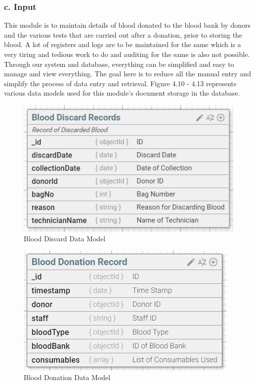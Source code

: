 \documentclass[BTech]{srmuthesis}
\begin{document}
\subsubsection{c. Input}
This module is to maintain details of blood donated to the blood bank by donors and the various tests that are carried out after a donation, prior to storing the blood. A lot of registers and logs are to be maintained for the same which is a very tiring and tedious work to do and auditing for the same is also not possible. Through our system and database, everything can be simplified and easy to manage and view everything. The goal here is to reduce all the manual entry and simplify the process of data entry and retrieval. Figure 4.10 - 4.13 represents various data models used for this module's document storage in the database.
\begin{figure}[H]
	\centering
	\includegraphics[scale=0.6]{input_blood_discard_rec.jpeg}
	\caption{Blood Discard Data Model}
\end{figure}
\begin{figure}[H]
	\centering
	\includegraphics[scale=0.6]{input_blood_donation.jpeg}
	\caption{Blood Donation Data Model}
\end{figure}
\end{document}
